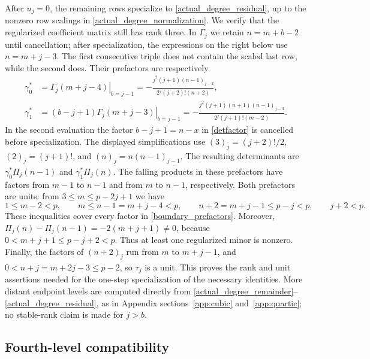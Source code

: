 \documentclass[12pt]{article}
\theoremstyle{remark}
\newcommand{\fall}[2]{(#1)_{\underline{#2}}}
\newcommand{\rise}[2]{(#1)_{\overline{#2}}}
\begin{document}
After $u_j=0$, the remaining rows specialize to
\eqref{actual_degree_residual}, up to the nonzero row scalings in
\eqref{actual_degree_normalization}.  We verify that the regularized coefficient matrix still has rank
three.  In $\Gamma_j$ we retain
$n=m+b-2$ until cancellation; after specialization, the expressions
on the right below use $n=m+j-3$.  The first consecutive triple does
not contain the scaled last row, while the second does.  Their
prefactors are respectively
\begin{equation}\label{boundary_prefactors}
\begin{aligned}
 \gamma_0^*
 &=\left.\Gamma_j(m+j-4)\right|_{b=j-1}
   =-\frac{j^2(j+1)\fall{n-1}{j-2}}
            {2^j(j+2)!(n+2)},\\
 \gamma_1^*
 &=\left.(b-j+1)\Gamma_j(m+j-3)\right|_{b=j-1}
   =-\frac{j^2(j+1)(n+1)\fall{n-1}{j-3}}
            {2^j(j+1)!(m-2)}.
\end{aligned}
\end{equation}
In the second evaluation the factor $b-j+1=n-x$ in
\eqref{detfactor} is cancelled before specialization.  The displayed
simplifications use
$\rise{3}{j}=(j+2)!/2$, $\rise{2}{j}=(j+1)!$, and
$\fall{n}{j}=n\fall{n-1}{j-1}$.
The resulting determinants are
$\gamma_0^*\Pi_j(n-1)$ and $\gamma_1^*\Pi_j(n)$.
The falling products in these prefactors have factors from $m-1$ to
$n-1$ and from $m$ to $n-1$, respectively.  Both prefactors are units:
from $3\le m\le p-2j+1$ we have
\[
 1\le m-2<p,\qquad
 m\le n-1=m+j-4<p,\qquad
 n+2=m+j-1\le p-j<p,\qquad j+2<p.
\]
These inequalities cover every factor in \eqref{boundary_prefactors}.
Moreover, $\Pi_j(n)-\Pi_j(n-1)=-2(m+j+1)\ne0$, because $0<m+j+1\le p-j+2<p$.  Thus at least one regularized
minor is nonzero.  Finally, the factors of $\fall{n+2}{j}$ run from
$m$ to $m+j-1$, and $0<n+j=m+2j-3\le p-2$, so $\tau_j$ is a unit.
This proves the rank and unit assertions needed for the one-step
specialization of the necessary identities.  More distant
endpoint levels are computed directly from
\eqref{actual_degree_remainder}--\eqref{actual_degree_residual}, as in
Appendix sections~\ref{app:cubic} and~\ref{app:quartic}; no stable-rank claim
is made for $j>b$.

\subsection{Fourth-level compatibility}\label{app:fourth}
\end{document}
